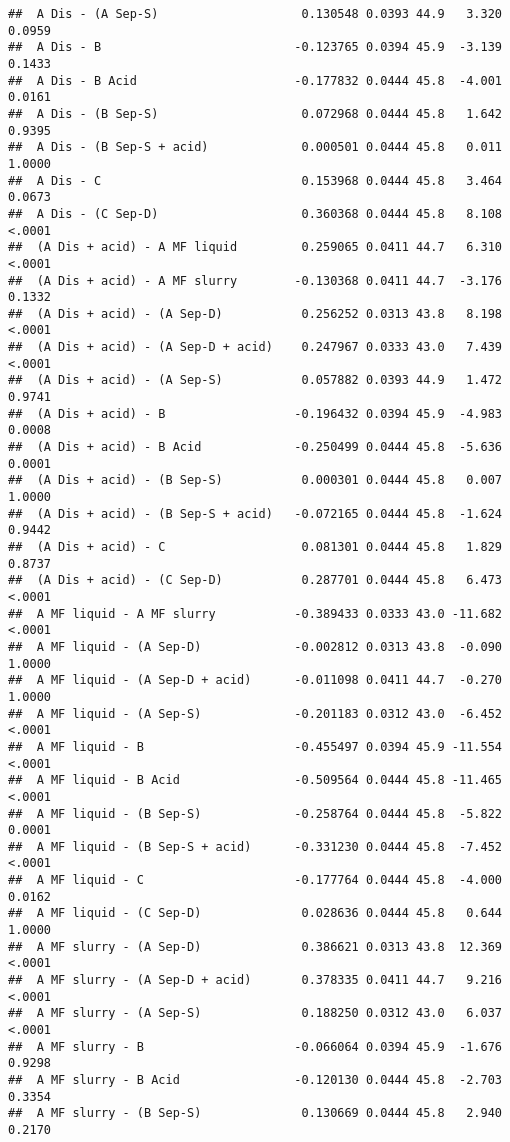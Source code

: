 \documentclass[
]{article}
\begin{document}
\begin{verbatim}
##  A Dis - (A Sep-S)                    0.130548 0.0393 44.9   3.320  0.0959
##  A Dis - B                           -0.123765 0.0394 45.9  -3.139  0.1433
##  A Dis - B Acid                      -0.177832 0.0444 45.8  -4.001  0.0161
##  A Dis - (B Sep-S)                    0.072968 0.0444 45.8   1.642  0.9395
##  A Dis - (B Sep-S + acid)             0.000501 0.0444 45.8   0.011  1.0000
##  A Dis - C                            0.153968 0.0444 45.8   3.464  0.0673
##  A Dis - (C Sep-D)                    0.360368 0.0444 45.8   8.108  <.0001
##  (A Dis + acid) - A MF liquid         0.259065 0.0411 44.7   6.310  <.0001
##  (A Dis + acid) - A MF slurry        -0.130368 0.0411 44.7  -3.176  0.1332
##  (A Dis + acid) - (A Sep-D)           0.256252 0.0313 43.8   8.198  <.0001
##  (A Dis + acid) - (A Sep-D + acid)    0.247967 0.0333 43.0   7.439  <.0001
##  (A Dis + acid) - (A Sep-S)           0.057882 0.0393 44.9   1.472  0.9741
##  (A Dis + acid) - B                  -0.196432 0.0394 45.9  -4.983  0.0008
##  (A Dis + acid) - B Acid             -0.250499 0.0444 45.8  -5.636  0.0001
##  (A Dis + acid) - (B Sep-S)           0.000301 0.0444 45.8   0.007  1.0000
##  (A Dis + acid) - (B Sep-S + acid)   -0.072165 0.0444 45.8  -1.624  0.9442
##  (A Dis + acid) - C                   0.081301 0.0444 45.8   1.829  0.8737
##  (A Dis + acid) - (C Sep-D)           0.287701 0.0444 45.8   6.473  <.0001
##  A MF liquid - A MF slurry           -0.389433 0.0333 43.0 -11.682  <.0001
##  A MF liquid - (A Sep-D)             -0.002812 0.0313 43.8  -0.090  1.0000
##  A MF liquid - (A Sep-D + acid)      -0.011098 0.0411 44.7  -0.270  1.0000
##  A MF liquid - (A Sep-S)             -0.201183 0.0312 43.0  -6.452  <.0001
##  A MF liquid - B                     -0.455497 0.0394 45.9 -11.554  <.0001
##  A MF liquid - B Acid                -0.509564 0.0444 45.8 -11.465  <.0001
##  A MF liquid - (B Sep-S)             -0.258764 0.0444 45.8  -5.822  0.0001
##  A MF liquid - (B Sep-S + acid)      -0.331230 0.0444 45.8  -7.452  <.0001
##  A MF liquid - C                     -0.177764 0.0444 45.8  -4.000  0.0162
##  A MF liquid - (C Sep-D)              0.028636 0.0444 45.8   0.644  1.0000
##  A MF slurry - (A Sep-D)              0.386621 0.0313 43.8  12.369  <.0001
##  A MF slurry - (A Sep-D + acid)       0.378335 0.0411 44.7   9.216  <.0001
##  A MF slurry - (A Sep-S)              0.188250 0.0312 43.0   6.037  <.0001
##  A MF slurry - B                     -0.066064 0.0394 45.9  -1.676  0.9298
##  A MF slurry - B Acid                -0.120130 0.0444 45.8  -2.703  0.3354
##  A MF slurry - (B Sep-S)              0.130669 0.0444 45.8   2.940  0.2170

\end{verbatim}
\end{document}

